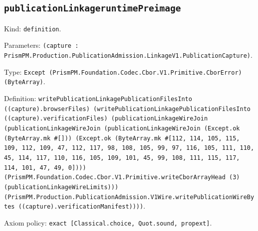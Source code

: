 \documentclass[11pt]{article}
\begin{document}
\subsection*{\texttt{publicationLinkageruntimePreimage}}
\noindent Kind: \texttt{definition}.\par
\noindent Parameters: \texttt{(capture : PrismPM.Production.PublicationAdmission.LinkageV1.PublicationCapture)}.\par
\noindent Type: \texttt{Except (PrismPM.Foundation.Codec.Cbor.V1.Primitive.CborError) (ByteArray)}.\par
\noindent Definition: \texttt{writePublicationLinkagePublicationFilesInto ((capture).browserFiles) (writePublicationLinkagePublicationFilesInto ((capture).verificationFiles) (publicationLinkageWireJoin (publicationLinkageWireJoin (publicationLinkageWireJoin (Except.ok (ByteArray.mk \#[])) (Except.ok (ByteArray.mk \#[112, 114, 105, 115, 109, 112, 109, 47, 112, 117, 98, 108, 105, 99, 97, 116, 105, 111, 110, 45, 114, 117, 110, 116, 105, 109, 101, 45, 99, 108, 111, 115, 117, 114, 101, 47, 49, 0]))) (PrismPM.Foundation.Codec.Cbor.V1.Primitive.writeCborArrayHead (3) (publicationLinkageWireLimits))) (PrismPM.Production.PublicationAdmission.V1Wire.writePublicationWireBytes ((capture).verificationManifest))))}.\par
\noindent Axiom policy: \texttt{exact [Classical.choice, Quot.sound, propext]}.\par
\end{document}
